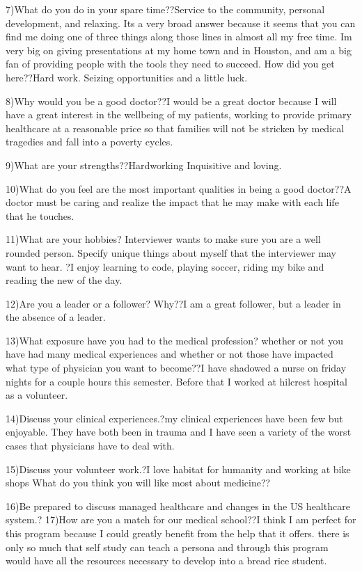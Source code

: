 \documentclass[12pt,a4paper,article]{memoir} %
\begin{document}
7)What do you do in your spare time??Service to the community, personal development, and relaxing. Its a very broad answer because it seems that  you can find me doing one of three things along those lines in almost all my free time. Im very big on giving presentations at my home town and in Houston, and am a big fan of providing people with the tools they need to succeed.  
How did you get here??Hard work. Seizing opportunities and a little luck. 

8)Why would you be a good doctor??I would be a great doctor because I will have a great interest in the wellbeing of my patients, working to provide primary healthcare at a reasonable price so that families will not be stricken by medical tragedies and fall into a poverty cycles.

9)What are your strengths??Hardworking
Inquisitive
and loving.

10)What do you feel are the most important qualities in being a good doctor??A doctor must be caring and realize the impact that he may make with each life that he touches.

11)What are your hobbies? Interviewer wants to make sure you are a well rounded person.  Specify unique things about myself that the interviewer may want to hear.
?I enjoy learning to code, playing soccer, riding my bike and reading the new of the day.

12)Are you a leader or a follower? Why??I am a great follower, but a leader in the absence of a leader.

13)What exposure have you had to the medical profession? whether or not you have had many medical experiences and whether or not those have impacted what type of physician you want to become??I have shadowed a nurse on friday nights for a couple hours this semester.  Before that I worked at hilcrest hospital as a volunteer.

14)Discuss your clinical experiences.?my clinical experiences have been few but enjoyable.  They have both been in trauma and I have seen a variety of the worst cases that physicians have to deal with.  

15)Discuss your volunteer work.?I love habitat for humanity and working at bike shops
What do you think you will like most about medicine??

16)Be prepared to discuss managed healthcare and changes in the US healthcare system.?
17)How are you a match for our medical school??I think I am perfect for this program because I could greatly benefit from the help that it offers.  there is only so much that self study can teach a persona and through this program  would have all the resources necessary to develop into a bread rice student.
\end{document}
